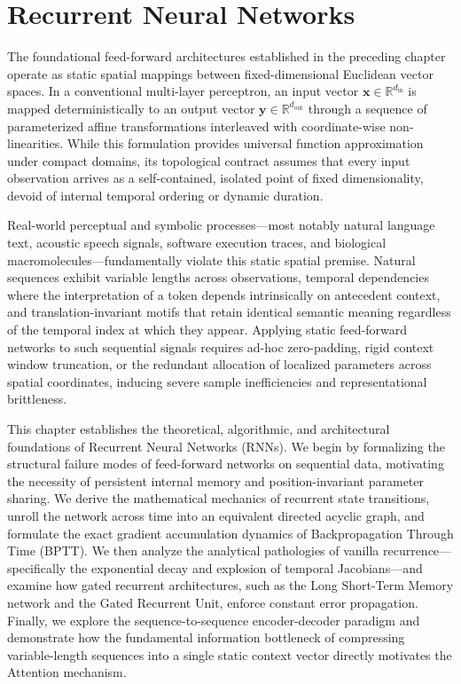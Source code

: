 \documentclass[../../../main.tex]{subfiles}
\begin{document}
\chapter{Recurrent Neural Networks}
\label{ch:recurrent_neural_networks}
\label{ch:rnn_sequence_modeling}

The foundational feed-forward architectures established in the preceding chapter operate as static spatial mappings between fixed-dimensional Euclidean vector spaces. In a conventional multi-layer perceptron, an input vector $\mathbf{x} \in \mathbb{R}^{d_{\text{in}}}$ is mapped deterministically to an output vector $\mathbf{y} \in \mathbb{R}^{d_{\text{out}}}$ through a sequence of parameterized affine transformations interleaved with coordinate-wise non-linearities. While this formulation provides universal function approximation under compact domains, its topological contract assumes that every input observation arrives as a self-contained, isolated point of fixed dimensionality, devoid of internal temporal ordering or dynamic duration.

Real-world perceptual and symbolic processes—most notably natural language text, acoustic speech signals, software execution traces, and biological macromolecules—fundamentally violate this static spatial premise. Natural sequences exhibit variable lengths across observations, temporal dependencies where the interpretation of a token depends intrinsically on antecedent context, and translation-invariant motifs that retain identical semantic meaning regardless of the temporal index at which they appear. Applying static feed-forward networks to such sequential signals requires ad-hoc zero-padding, rigid context window truncation, or the redundant allocation of localized parameters across spatial coordinates, inducing severe sample inefficiencies and representational brittleness.

This chapter establishes the theoretical, algorithmic, and architectural foundations of Recurrent Neural Networks (RNNs). We begin by formalizing the structural failure modes of feed-forward networks on sequential data, motivating the necessity of persistent internal memory and position-invariant parameter sharing. We derive the mathematical mechanics of recurrent state transitions, unroll the network across time into an equivalent directed acyclic graph, and formulate the exact gradient accumulation dynamics of Backpropagation Through Time (BPTT). We then analyze the analytical pathologies of vanilla recurrence—specifically the exponential decay and explosion of temporal Jacobians—and examine how gated recurrent architectures, such as the Long Short-Term Memory network and the Gated Recurrent Unit, enforce constant error propagation. Finally, we explore the sequence-to-sequence encoder-decoder paradigm and demonstrate how the fundamental information bottleneck of compressing variable-length sequences into a single static context vector directly motivates the Attention mechanism.
\end{document}
